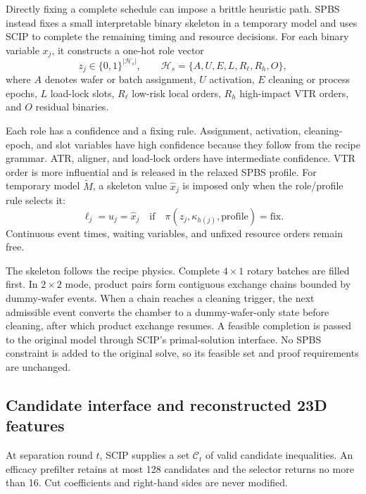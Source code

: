 \documentclass[preprint,12pt,authoryear]{elsarticle}
\begin{document}
Directly fixing a complete schedule can impose a brittle heuristic path. SPBS
instead fixes a small interpretable binary skeleton in a temporary model and
uses SCIP to complete the remaining timing and resource decisions. For each
binary variable $x_j$, it constructs a one-hot role vector
\[
 z_j\in\{0,1\}^{|\mathcal H_s|},\qquad
 \mathcal H_s=\{A,U,E,L,R_{\ell},R_h,O\},
\]
where $A$ denotes wafer or batch assignment, $U$ activation, $E$ cleaning or
process epochs, $L$ load-lock slots, $R_{\ell}$ low-risk local orders, $R_h$
high-impact VTR orders, and $O$ residual binaries.

Each role has a confidence and a fixing rule. Assignment, activation,
cleaning-epoch, and slot variables have high confidence because they follow
from the recipe grammar. ATR, aligner, and load-lock orders have intermediate
confidence. VTR order is more influential and is released in the relaxed SPBS
profile. For temporary model $\widetilde M$, a skeleton value $\widehat x_j$
is imposed only when the role/profile rule selects it:
\[
 \ell_j=u_j=\widehat x_j
 \quad\text{if}\quad
 \pi(z_j,\kappa_{h(j)},\text{profile})=\text{fix}.
\]
Continuous event times, waiting variables, and unfixed resource orders remain
free.

The skeleton follows the recipe physics. Complete $4\times1$ rotary batches
are filled first. In $2\times2$ mode, product pairs form contiguous exchange
chains bounded by dummy-wafer events. When a chain reaches a cleaning trigger, the
next admissible event converts the chamber to a dummy-wafer-only state before
cleaning, after which product exchange resumes. A feasible completion is
passed to the original model through SCIP's primal-solution interface. No SPBS
constraint is added to the original solve, so its feasible set and proof
requirements are unchanged.

\subsection{Candidate interface and reconstructed 23D features}

At separation round $t$, SCIP supplies a set $\mathcal C_t$ of valid candidate
inequalities. An efficacy prefilter retains at most 128 candidates and the
selector returns no more than 16. Cut coefficients and right-hand sides are
never modified.
\end{document}
